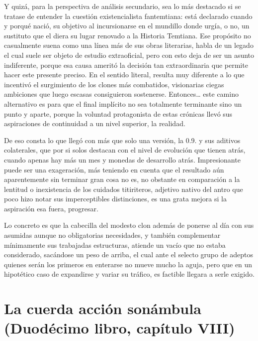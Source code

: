 \documentclass[
]{book}
\begin{document}
Y quizá, para la perspectiva de análisis secundario, sea lo más destacado si se tratase de entender la cuestión existencialista fantemtiana: está declarado cuando y porqué nació, su objetivo al incursionarse en el mundillo donde urgía, o no, un sustituto que el diera su lugar renovado a la Historia Temtiana. Ese propósito no casualmente suena como una línea más de sus obras literarias, habla de un legado el cual suele ser objeto de estudio extraoficial, pero con esto deja de ser un asunto indiferente, porque esa causa ameritó la decisión tan extraordinaria que permite hacer este presente preciso. En el sentido literal, resulta muy diferente a lo que incentivó el surgimiento de los clones más combatidos, visionarias ciegas ambiciones que luego escasas consiguieron sostenerse. Entonces\ldots{} este camino alternativo es para que el final implícito no sea totalmente terminante sino un punto y aparte, porque la voluntad protagonista de estas crónicas llevó sus aspiraciones de continuidad a un nivel superior, la realidad.

De eso consta lo que llegó con más que solo una versión, la 0.9. y sus aditivos colaterales, que por si solos destacan con el nivel de evolución que tienen atrás, cuando apenas hay más un mes y monedas de desarrollo atrás. Impresionante puede ser una exageración, más teniendo en cuenta que el resultado aún aparentemente sin terminar gran cosa no es, no obstante en comparación a la lentitud o inexistencia de los cuidados titiriteros, adjetivo nativo del antro que poco hizo notar sus imperceptibles distinciones, es una grata mejora si la aspiración esa fuera, progresar.

Lo concreto es que la cabecilla del modesto clon además de ponerse al día con sus asumidas aunque no obligatorias necesidades, y también complementar mínimamente sus trabajadas estructuras, atiende un vacío que no estaba considerado, sacándose un peso de arriba, el cual ante el selecto grupo de adeptos quienes serán los primeros en enterarse no mueve mucho la aguja, pero que en un hipotético caso de expandirse y variar su tráfico, es factible llegara a serle exigido.

\hypertarget{la-cuerda-acciuxf3n-sonuxe1mbula-duoduxe9cimo-libro-capuxedtulo-viii}{%
\section{La cuerda acción sonámbula (Duodécimo libro, capítulo VIII)}\label{la-cuerda-acciuxf3n-sonuxe1mbula-duoduxe9cimo-libro-capuxedtulo-viii}}
\end{document}
